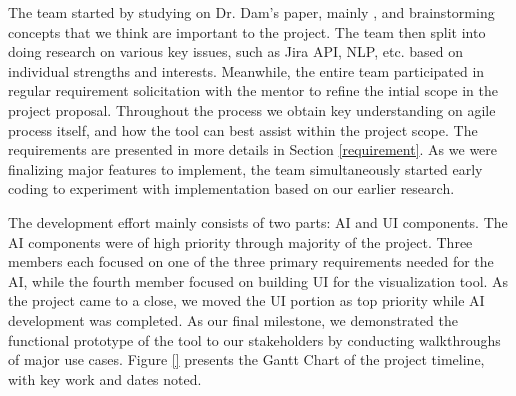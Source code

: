 The team started by studying on Dr. Dam's paper, mainly \cite{dam1}, and brainstorming concepts that we think are important to the project. The team then split into doing research on various key issues, such as Jira API, NLP, etc. based on individual strengths and interests. Meanwhile, the entire team participated in regular requirement solicitation with the mentor to refine the intial scope in the project proposal. Throughout the process we obtain key understanding on agile process itself, and how the tool can best assist within the project scope. The requirements are presented in more details in Section \ref{requirement}. As we were finalizing major features to implement, the team simultaneously started early coding to experiment with implementation based on our earlier research. 

The development effort mainly consists of two parts: AI and UI components.  The AI components were of high priority through majority of the project. Three members each focused on one of the three primary requirements needed for the AI, while the fourth member focused on building UI for the visualization tool. As the project came to a close, we moved the UI portion as top priority while AI development was completed. As our final milestone, we demonstrated the functional prototype of the tool to our stakeholders by conducting walkthroughs of major use cases. Figure \ref{} presents the Gantt Chart of the project timeline, with key work and dates noted. 

